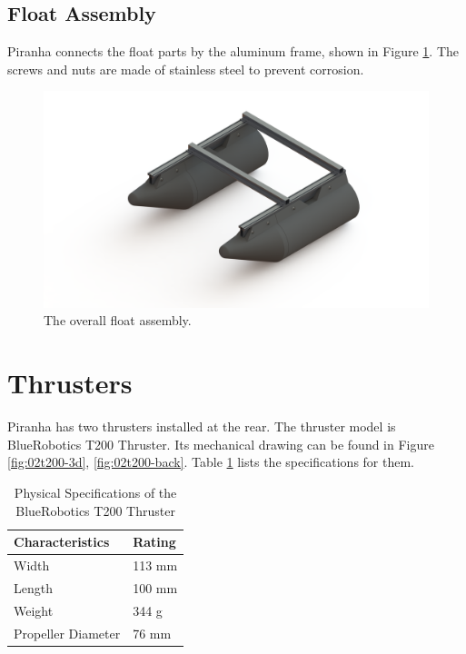 \subsection{Float Assembly}

Piranha connects the float parts by the aluminum frame, shown in Figure \ref{fig:02orca-frame}. The screws and nuts are made of stainless steel to prevent corrosion.

\begin{figure}[H]
    \centering
    \includegraphics[width=.8\textwidth]{images/02orca-frame.png}
    \caption{The overall float assembly.}
    \label{fig:02orca-frame}
\end{figure}

\section{Thrusters}

Piranha has two thrusters installed at the rear. The thruster model is BlueRobotics T200 Thruster. Its mechanical drawing can be found in Figure \ref{fig:02t200-3d}, \ref{fig:02t200-back}. Table \ref{table:02thruster} lists the specifications for them.

\begin{table}[H]
\caption{Physical Specifications of the BlueRobotics T200 Thruster} %
\centering %
\renewcommand{\arraystretch}{0.8}
\begin{tabular}{l l}
\hline
\textbf{Characteristics} & \textbf{Rating} \\ 
\hline %
Width & 113 mm \\
Length & 100 mm \\
Weight & 344 g \\
Propeller Diameter & 76 mm \\
\hline
\end{tabular}
\label{table:02thruster} %
\end{table}

